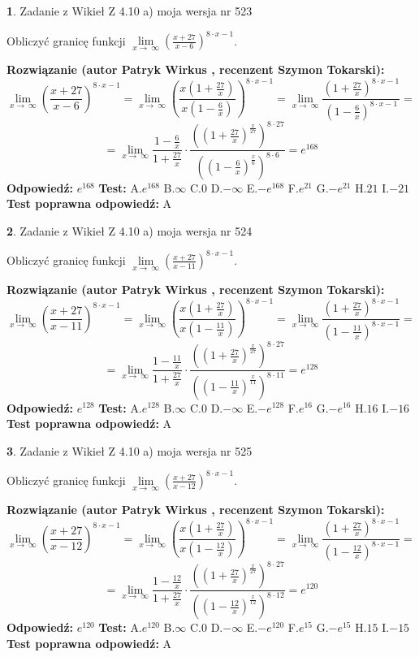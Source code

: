 \documentclass[12pt, a4paper]{article}
\theoremstyle{definition} %
\newtheorem{zad}{}
\newcommand{\zadStart}[1]{\begin{zad}#1\newline}
\newcommand{\zadStop}{\end{zad}}
\newcommand{\rozwStart}[2]{\noindent \textbf{Rozwiązanie (autor #1 , recenzent #2): }\newline}
\newcommand{\rozwStop}{\newline}
\newcommand{\odpStart}{\noindent \textbf{Odpowiedź:}\newline}
\newcommand{\odpStop}{\newline}
\newcommand{\testStart}{\noindent \textbf{Test:}\newline}
\newcommand{\testStop}{\newline}
\newcommand{\kluczStart}{\noindent \textbf{Test poprawna odpowiedź:}\newline}
\newcommand{\kluczStop}{\newline}
\begin{document}
\zadStart{Zadanie z Wikieł Z 4.10 a) moja wersja nr 523}

Obliczyć granicę funkcji  $\lim\limits_{x\to\ \infty}(\frac{x+27}{x-6})^{8\cdot x-1}$.
\zadStop
\rozwStart{Patryk Wirkus}{Szymon Tokarski}
$$\lim\limits_{x\to\ \infty}(\frac{x+27}{x-6})^{8\cdot x-1} = \lim\limits_{x\to\ \infty}(\frac{x(1+\frac{27}{x})}{x(1-\frac{6}{x})})^{8\cdot x-1}=\lim\limits_{x\to\ \infty}\frac{(1+\frac{27}{x})^{8\cdot x-1}}{(1-\frac{6}{x})^{8\cdot x-1}}=$$
$$=\lim\limits_{x\to\ \infty}\frac{1-\frac{6}{x}}{1+\frac{27}{x}}\cdot\frac{((1+\frac{27}{x})^{\frac{x}{27}})^{8\cdot27}}{((1-\frac{6}{x})^{\frac{x}{6}})^{8\cdot6}}=e^{168}$$
\rozwStop
\odpStart
$e^{168}$
\odpStop
\testStart
A.$e^{168}$ B.$\infty$ C.$0$ D.$-\infty$ E.$-e^{168}$
F.$e^{21}$ G.$-e^{21}$
H.$21$
I.$-21$
\testStop
\kluczStart
A
\kluczStop



\zadStart{Zadanie z Wikieł Z 4.10 a) moja wersja nr 524}

Obliczyć granicę funkcji  $\lim\limits_{x\to\ \infty}(\frac{x+27}{x-11})^{8\cdot x-1}$.
\zadStop
\rozwStart{Patryk Wirkus}{Szymon Tokarski}
$$\lim\limits_{x\to\ \infty}(\frac{x+27}{x-11})^{8\cdot x-1} = \lim\limits_{x\to\ \infty}(\frac{x(1+\frac{27}{x})}{x(1-\frac{11}{x})})^{8\cdot x-1}=\lim\limits_{x\to\ \infty}\frac{(1+\frac{27}{x})^{8\cdot x-1}}{(1-\frac{11}{x})^{8\cdot x-1}}=$$
$$=\lim\limits_{x\to\ \infty}\frac{1-\frac{11}{x}}{1+\frac{27}{x}}\cdot\frac{((1+\frac{27}{x})^{\frac{x}{27}})^{8\cdot27}}{((1-\frac{11}{x})^{\frac{x}{11}})^{8\cdot11}}=e^{128}$$
\rozwStop
\odpStart
$e^{128}$
\odpStop
\testStart
A.$e^{128}$ B.$\infty$ C.$0$ D.$-\infty$ E.$-e^{128}$
F.$e^{16}$ G.$-e^{16}$
H.$16$
I.$-16$
\testStop
\kluczStart
A
\kluczStop



\zadStart{Zadanie z Wikieł Z 4.10 a) moja wersja nr 525}

Obliczyć granicę funkcji  $\lim\limits_{x\to\ \infty}(\frac{x+27}{x-12})^{8\cdot x-1}$.
\zadStop
\rozwStart{Patryk Wirkus}{Szymon Tokarski}
$$\lim\limits_{x\to\ \infty}(\frac{x+27}{x-12})^{8\cdot x-1} = \lim\limits_{x\to\ \infty}(\frac{x(1+\frac{27}{x})}{x(1-\frac{12}{x})})^{8\cdot x-1}=\lim\limits_{x\to\ \infty}\frac{(1+\frac{27}{x})^{8\cdot x-1}}{(1-\frac{12}{x})^{8\cdot x-1}}=$$
$$=\lim\limits_{x\to\ \infty}\frac{1-\frac{12}{x}}{1+\frac{27}{x}}\cdot\frac{((1+\frac{27}{x})^{\frac{x}{27}})^{8\cdot27}}{((1-\frac{12}{x})^{\frac{x}{12}})^{8\cdot12}}=e^{120}$$
\rozwStop
\odpStart
$e^{120}$
\odpStop
\testStart
A.$e^{120}$ B.$\infty$ C.$0$ D.$-\infty$ E.$-e^{120}$
F.$e^{15}$ G.$-e^{15}$
H.$15$
I.$-15$
\testStop
\kluczStart
A
\kluczStop
\end{document}
